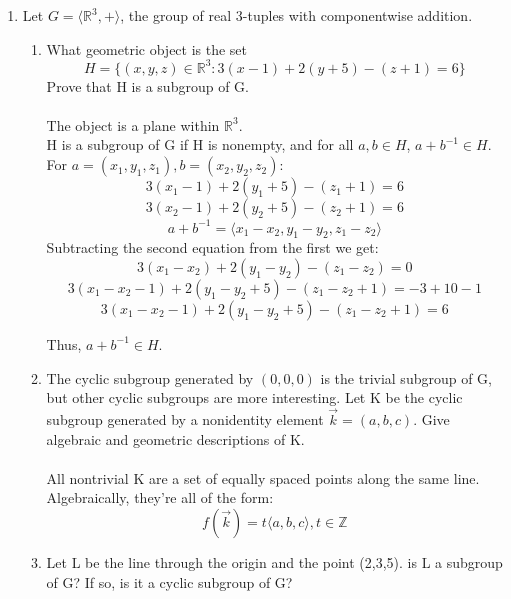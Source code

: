 
\usepackage{amsmath, dsfont}

\newenvironment{amatrix}[1]{%
  \left(\begin{array}{@{}*{#1}{c}|c@{}}
}{%
  \end{array}\right)
}

\makeatletter
\renewcommand*\env@matrix[1][*\c@MaxMatrixCols c]{%
  \hskip -\arraycolsep
  \let\@ifnextchar\new@ifnextchar
  \array{#1}}
\makeatother



\pagestyle{myheadings}


\begin{enumerate}
\item Let $G = \langle \mathds{R}^3, + \rangle$, the group of real 3-tuples with componentwise addition.
  \begin{enumerate}
  \item
    What geometric object is the set $$H = \{(x,y,z) \in \mathds{R}^3 : 3(x-1) + 2(y+5) - (z+1) = 6 \}$$
    Prove that H is a subgroup of G.\\\\

    The object is a plane within $\mathds{R}^3$.\\
    H is a subgroup of G if H is nonempty, and for all $a, b \in H$, $a+b^{-1} \in H$.
    For $a=(x_1,y_1,z_1), b=(x_2,y_2,z_2)$:
    $$3(x_1-1) + 2(y_1+5)-(z_1+1) = 6$$
    $$3(x_2-1) + 2(y_2+5)-(z_2+1) = 6$$
    $$a + b^{-1} = \langle x_1-x_2,y_1-y_2,z_1-z_2 \rangle$$
    Subtracting the second equation from the first we get:
    $$3(x_1-x_2) + 2(y_1-y_2) - (z_1-z_2) = 0$$
    $$3(x_1-x_2-1) + 2(y_1-y_2+5) - (z_1-z_2+1) = -3 + 10 - 1$$
    $$3(x_1-x_2-1) + 2(y_1-y_2+5) - (z_1-z_2+1) = 6$$

    Thus, $a + b^{-1} \in H$. 

  \item
    The cyclic subgroup generated by $(0,0,0)$ is the trivial subgroup of G, but other cyclic subgroups are more interesting. Let K be the cyclic subgroup generated by a nonidentity element $\vec{k}=(a,b,c)$. Give algebraic and geometric descriptions of K.\\\\

    All nontrivial K are a set of equally spaced points along the same line. Algebraically, they're all of the form:
    $$f(\vec{k}) = t \langle a,b,c \rangle, t \in \mathds{Z}$$
    
  \item
    Let L be the line through the origin and the point (2,3,5). is L a subgroup of G? If so, is it a cyclic subgroup of G?\\\\


\end{enumerate}
\end{enumerate}

